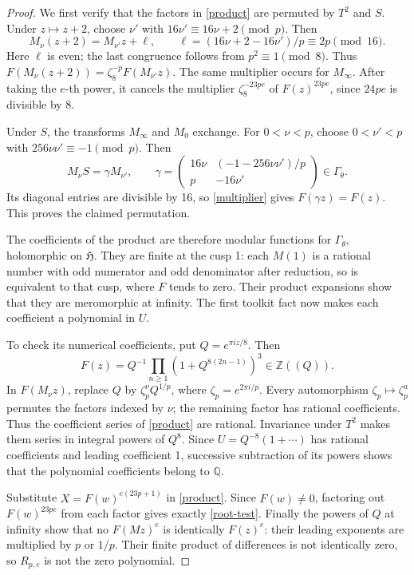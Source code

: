 \documentclass[11pt]{article}
\newcommand{\Z}{\mathbb Z}
\newcommand{\Q}{\mathbb Q}
\newcommand{\HH}{\mathfrak H}
\newcommand{\G}{\Gamma_\theta}
\begin{document}
\begin{proof}
We first verify that the factors in \eqref{product} are permuted by
\(T^2\) and \(S\). Under \(z\mapsto z+2\), choose \(\nu'\)
with \(16\nu'\equiv16\nu+2\pmod p\). Then
\[
 M_\nu(z+2)=M_{\nu'}z+\ell,\qquad
 \ell=(16\nu+2-16\nu')/p\equiv2p\pmod {16}.
\]
Here \(\ell\) is even; the last congruence follows from
\(p^2\equiv1\pmod8\). Thus \(F(M_\nu(z+2))=
\zeta_8^{-p}F(M_{\nu'}z)\). The same multiplier occurs for
\(M_\infty\). After taking the \(e\)-th power, it cancels the multiplier
\(\zeta_8^{-23pe}\) of \(F(z)^{23pe}\), since \(24pe\)
is divisible by 8.

Under \(S\), the transforms \(M_\infty\) and \(M_0\) exchange.
For \(0<\nu<p\), choose \(0<\nu'<p\) with
\(256\nu\nu'\equiv-1\pmod p\). Then
\[
 M_\nu S=\gamma M_{\nu'},\qquad
 \gamma=\begin{pmatrix}
 16\nu&(-1-256\nu\nu')/p\\ p&-16\nu'
 \end{pmatrix}\in\G.
\]
Its diagonal entries are divisible by 16, so \eqref{multiplier}
gives \(F(\gamma z)=F(z)\). This proves the claimed permutation.

The coefficients of the product are therefore modular functions for
\(\G\), holomorphic on \(\HH\). They are finite at the cusp 1:
each \(M(1)\) is a rational number with odd numerator and odd
denominator after reduction, so is equivalent to that cusp, where
\(F\) tends to zero. Their product expansions show that they are
meromorphic at infinity. The first toolkit fact now makes each
coefficient a polynomial in \(U\).

To check its numerical coefficients, put \(Q=e^{\pi iz/8}\). Then
\[
 F(z)=Q^{-1}\prod_{n\ge1}(1+Q^{8(2n-1)})^3
       \in\Z((Q)).
\]
In \(F(M_\nu z)\), replace \(Q\) by
\(\zeta_p^\nu Q^{1/p}\), where \(\zeta_p=e^{2\pi i/p}\).
Every automorphism \(\zeta_p\mapsto\zeta_p^a\) permutes the
factors indexed by \(\nu\); the remaining factor has rational
coefficients. Thus the coefficient series of \eqref{product} are
rational. Invariance under \(T^2\) makes them series in integral
powers of \(Q^8\). Since \(U=Q^{-8}(1+\cdots)\) has rational
coefficients and leading coefficient 1, successive subtraction of
its powers shows that the polynomial coefficients belong to \(\Q\).

Substitute \(X=F(w)^{e(23p+1)}\) in \eqref{product}. Since
\(F(w)\ne0\), factoring out \(F(w)^{23pe}\) from each factor
gives exactly \eqref{root-test}. Finally the powers of \(Q\)
at infinity show that no \(F(Mz)^e\) is identically \(F(z)^e\):
their leading exponents are multiplied by \(p\) or \(1/p\).
Their finite product of differences is not identically zero, so
\(R_{p,e}\) is not the zero polynomial.
\end{proof}
\end{document}
